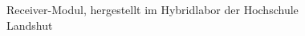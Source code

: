 \documentclass[12pt]{scrreprt} %
\begin{document}
\begin{figure}
\centering
{}
\caption{Receiver-Modul, hergestellt im Hybridlabor der Hochschule Landshut}
\label{self_rec}
\end{figure}
\end{document}
